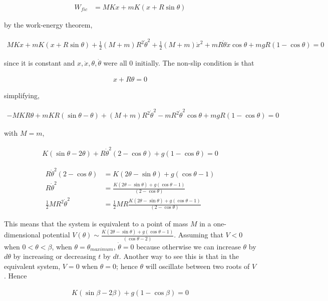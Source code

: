 \documentclass{article}
\newcommand{\half}{\frac{1}{2}}
\begin{document}
\begin{align*}
W_{fic} &= MKx + mK(x + R\sin\theta)
\end{align*}

by the work-energy theorem,

\begin{align*}
MKx + mK(x + R\sin\theta) + \half (M+m) R^2 \dot{\theta}^2 + \half (M+m) \dot{x}^2 + mR\dot\theta \dot x\cos\theta + mgR(1 - \cos\theta) = 0
\end{align*}

since it is constant and $x, \dot{x}, \theta, \dot{\theta}$ were all 0 initially. The non-slip condition is that

\begin{align*}
x + R\theta = 0
\end{align*}

simplifying,

\begin{align*}
-MKR\theta + mKR(\sin\theta - \theta) + (M+m) R^2 \dot{\theta}^2 - mR^2\dot\theta^2\cos\theta + mgR(1 - \cos\theta) = 0
\end{align*}

with $M=m$,

\begin{align*}
K(\sin\theta - 2\theta) + R \dot{\theta}^2 (2 - \cos\theta) + g(1 - \cos\theta) = 0
\end{align*}

\begin{align*}
R \dot{\theta}^2 (2 - \cos\theta) &= K(2\theta - \sin\theta)+ g(\cos\theta - 1) \\
R \dot{\theta}^2 &= \frac{K(2\theta - \sin\theta)+ g(\cos\theta - 1)}{(2 - \cos\theta)} \\
\half MR^2 \dot{\theta}^2 &= \half MR \frac{K(2\theta - \sin\theta)+ g(\cos\theta - 1)}{(2 - \cos\theta)}
\end{align*}

This means that the system is equivalent to a point of mass $M$ in a one-dimensional potential $V(\theta) \sim \frac{K(2\theta - \sin\theta)+ g(\cos\theta - 1)}{(\cos\theta - 2)}$. Assuming that $V < 0$ when $0 < \theta < \beta$, when $\theta = \theta_{maximum}$, $\dot\theta = 0$ because otherwise we can increase $\theta$ by $d\theta$ by increasing or decreasing $t$ by $dt$. Another way to see this is that in the equivalent system, $V = 0$ when $\theta = 0$; hence $\theta$ will oscillate between two roots of $V$. Hence

\begin{align*}
K(\sin\beta - 2\beta) + g(1 - \cos\beta) = 0
\end{align*}
\end{document}
